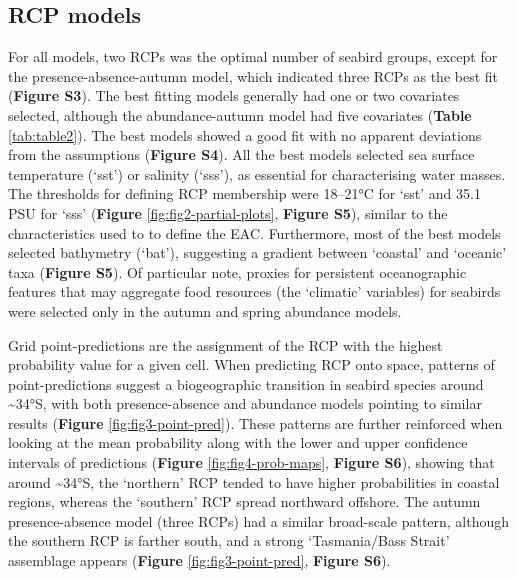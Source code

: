 \documentclass{article}
\begin{document}
\begin{linenumbers}
\hypertarget{rcp-models}{%
\subsection{RCP models}\label{rcp-models}}

For all models, two RCPs was the optimal number of seabird groups, except for the presence-absence-autumn model, which indicated three RCPs as the best fit (\textbf{Figure S3}). The best fitting models generally had one or two covariates selected, although the abundance-autumn model had five covariates (\textbf{Table} \ref{tab:table2}). The best models showed a good fit with no apparent deviations from the assumptions (\textbf{Figure S4}). All the best models selected sea surface temperature (`sst') or salinity (`sss'), as essential for characterising water masses. The thresholds for defining RCP membership were 18--21°C for `sst' and 35.1 PSU for `sss' (\textbf{Figure} \ref{fig:fig2-partial-plots}, \textbf{Figure S5}), similar to the characteristics used to to define the EAC. Furthermore, most of the best models selected bathymetry (`bat'), suggesting a gradient between `coastal' and `oceanic' taxa (\textbf{Figure S5}). Of particular note, proxies for persistent oceanographic features that may aggregate food resources (the `climatic' variables) for seabirds were selected only in the autumn and spring abundance models.

Grid point-predictions are the assignment of the RCP with the highest probability value for a given cell. When predicting RCP onto space, patterns of point-predictions suggest a biogeographic transition in seabird species around \textasciitilde34°S, with both presence-absence and abundance models pointing to similar results (\textbf{Figure} \ref{fig:fig3-point-pred}). These patterns are further reinforced when looking at the mean probability along with the lower and upper confidence intervals of predictions (\textbf{Figure} \ref{fig:fig4-prob-maps}, \textbf{Figure S6}), showing that around \textasciitilde34°S, the `northern' RCP tended to have higher probabilities in coastal regions, whereas the `southern' RCP spread northward offshore. The autumn presence-absence model (three RCPs) had a similar broad-scale pattern, although the southern RCP is farther south, and a strong `Tasmania/Bass Strait' assemblage appears (\textbf{Figure} \ref{fig:fig3-point-pred}, \textbf{Figure S6}).


\end{linenumbers}
\end{document}
